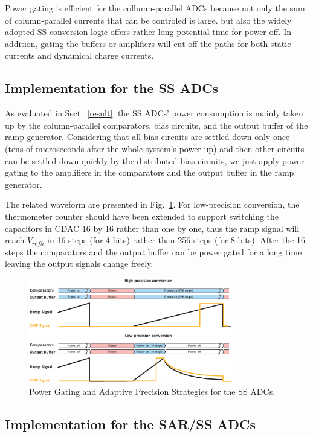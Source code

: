 \documentclass[conference]{IEEEtran}
\begin{document}
Power gating is efficient for the collumn-parallel ADCs because not only the sum of column-parallel currents that can be controled is large.
but also the widely adopted SS conversion logic offers rather long potential time for power off.
In addition, gating the buffers or amplifiers will cut off the paths for both static currents and dynamical charge currents. 

\subsection{Implementation for the SS ADCs}

As evaluated in Sect.~\ref{result}, the SS ADCs’ power consumption is mainly taken up by the column-parallel comparators, bias circuits, and the output buffer of the ramp generator. 
Considering that all bias circuits are settled down only once (tens of microseconds after the whole system's power up) and then other circuits can be settled down quickly by the distributed 
bias circuits, we just apply power gating to the amplifiers in the comparators and the output buffer in the ramp generator.

The related waveform are presented in Fig.~\ref{SS_pg}. For low-precision conversion, the thermometer counter should have been extended to support switching the capacitors in CDAC 16 by 16 
rather than one by one, thus the ramp signal will reach $V_{refh}$ in 16 steps (for 4 bits) rather than 256 steps (for 8 bits). After the 16 steps the comparators and the output buffer 
can be power gated for a long time leaving the output signals change freely.

\begin{figure}[htbp]
	\centerline{\includegraphics[width=3.5in]{./Figures/SS_pg.eps}}
	\caption{Power Gating and Adaptive Precision Strategies for the SS ADCs.}
	\label{SS_pg}
\end{figure} 

\subsection{Implementation for the SAR/SS ADCs}
\end{document}
